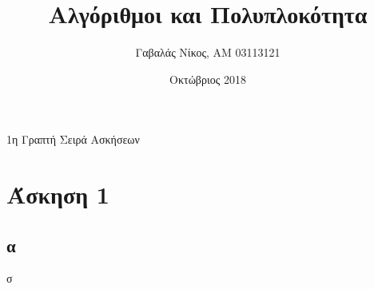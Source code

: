 \documentclass[10pt,a4paper]{article}
\title{Αλγόριθμοι και Πολυπλοκότητα}
\author{Γαβαλάς Νίκος, AM 03113121}
\date{Οκτώβριος 2018}
\begin{document}
  \maketitle

  \begin{center}
    \Large{1η Γραπτή Σειρά Ασκήσεων}
  \end{center}

  \section{Άσκηση 1}
  \subsection{α}

    σ
  
\end{document}
